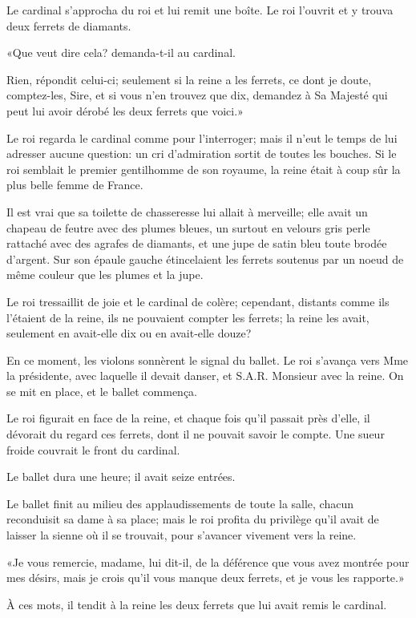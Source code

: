 Le cardinal s'approcha du roi et lui remit une boîte. Le roi l'ouvrit et y trouva deux ferrets de diamants. 

«Que veut dire cela? demanda-t-il au cardinal. 

\speak  Rien, répondit celui-ci; seulement si la reine a les ferrets, ce dont je doute, comptez-les, Sire, et si vous n'en trouvez que dix, demandez à Sa Majesté qui peut lui avoir dérobé les deux ferrets que voici.» 

Le roi regarda le cardinal comme pour l'interroger; mais il n'eut le temps de lui adresser aucune question: un cri d'admiration sortit de toutes les bouches. Si le roi semblait le premier gentilhomme de son royaume, la reine était à coup sûr la plus belle femme de France. 

Il est vrai que sa toilette de chasseresse lui allait à merveille; elle avait un chapeau de feutre avec des plumes bleues, un surtout en velours gris perle rattaché avec des agrafes de diamants, et une jupe de satin bleu toute brodée d'argent. Sur son épaule gauche étincelaient les ferrets soutenus par un noeud de même couleur que les plumes et la jupe. 

Le roi tressaillit de joie et le cardinal de colère; cependant, distants comme ils l'étaient de la reine, ils ne pouvaient compter les ferrets; la reine les avait, seulement en avait-elle dix ou en avait-elle douze? 

En ce moment, les violons sonnèrent le signal du ballet. Le roi s'avança vers Mme la présidente, avec laquelle il devait danser, et S.A.R. Monsieur avec la reine. On se mit en place, et le ballet commença. 

Le roi figurait en face de la reine, et chaque fois qu'il passait près d'elle, il dévorait du regard ces ferrets, dont il ne pouvait savoir le compte. Une sueur froide couvrait le front du cardinal. 

Le ballet dura une heure; il avait seize entrées. 

Le ballet finit au milieu des applaudissements de toute la salle, chacun reconduisit sa dame à sa place; mais le roi profita du privilège qu'il avait de laisser la sienne où il se trouvait, pour s'avancer vivement vers la reine. 

«Je vous remercie, madame, lui dit-il, de la déférence que vous avez montrée pour mes désirs, mais je crois qu'il vous manque deux ferrets, et je vous les rapporte.» 

À ces mots, il tendit à la reine les deux ferrets que lui avait remis le cardinal. 

